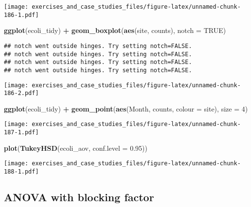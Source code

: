 \documentclass[]{book}
\newenvironment{Shaded}{\begin{snugshade}}{\end{snugshade}}
\newcommand{\DataTypeTok}[1]{\textcolor[rgb]{0.13,0.29,0.53}{#1}}
\newcommand{\DecValTok}[1]{\textcolor[rgb]{0.00,0.00,0.81}{#1}}
\newcommand{\FloatTok}[1]{\textcolor[rgb]{0.00,0.00,0.81}{#1}}
\newcommand{\KeywordTok}[1]{\textcolor[rgb]{0.13,0.29,0.53}{\textbf{#1}}}
\newcommand{\NormalTok}[1]{#1}
\newcommand{\OperatorTok}[1]{\textcolor[rgb]{0.81,0.36,0.00}{\textbf{#1}}}
\newcommand{\OtherTok}[1]{\textcolor[rgb]{0.56,0.35,0.01}{#1}}
\newcommand{\StringTok}[1]{\textcolor[rgb]{0.31,0.60,0.02}{#1}}
\theoremstyle{definition}
\theoremstyle{definition}
\theoremstyle{definition}
\theoremstyle{remark}
\begin{document}
\texttt{[image: exercises\_and\_case\_studies\_files/figure-latex/unnamed-chunk-186-1.pdf]}

\begin{Shaded}
\begin{Highlighting}[]
\KeywordTok{ggplot}\NormalTok{(ecoli_tidy) }\OperatorTok{+}
\StringTok{  }\KeywordTok{geom_boxplot}\NormalTok{(}\KeywordTok{aes}\NormalTok{(site, counts), }\DataTypeTok{notch =} \OtherTok{TRUE}\NormalTok{)}
\end{Highlighting}
\end{Shaded}

\begin{verbatim}
## notch went outside hinges. Try setting notch=FALSE.
## notch went outside hinges. Try setting notch=FALSE.
## notch went outside hinges. Try setting notch=FALSE.
## notch went outside hinges. Try setting notch=FALSE.
\end{verbatim}

\texttt{[image: exercises\_and\_case\_studies\_files/figure-latex/unnamed-chunk-186-2.pdf]}

\begin{Shaded}
\begin{Highlighting}[]
\KeywordTok{ggplot}\NormalTok{(ecoli_tidy) }\OperatorTok{+}
\StringTok{  }\KeywordTok{geom_point}\NormalTok{(}\KeywordTok{aes}\NormalTok{(Month, counts, }\DataTypeTok{colour =}\NormalTok{ site), }\DataTypeTok{size =} \DecValTok{4}\NormalTok{)}
\end{Highlighting}
\end{Shaded}

\texttt{[image: exercises\_and\_case\_studies\_files/figure-latex/unnamed-chunk-187-1.pdf]}

\begin{Shaded}
\begin{Highlighting}[]
\KeywordTok{plot}\NormalTok{(}\KeywordTok{TukeyHSD}\NormalTok{(ecoli_aov, }\DataTypeTok{conf.level =} \FloatTok{0.95}\NormalTok{))}
\end{Highlighting}
\end{Shaded}

\texttt{[image: exercises\_and\_case\_studies\_files/figure-latex/unnamed-chunk-188-1.pdf]}

\hypertarget{anova-with-blocking-factor}{%
\subsection{ANOVA with blocking
factor}\label{anova-with-blocking-factor}}
\end{document}
